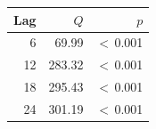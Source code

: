 \begin{tabular}{rrr}
\toprule
Lag & $Q$ & $p$\\
\midrule
6 & 69.99 & $<$\,0.001\\
12 & 283.32 & $<$\,0.001\\
18 & 295.43 & $<$\,0.001\\
24 & 301.19 & $<$\,0.001\\
\bottomrule
\end{tabular}
